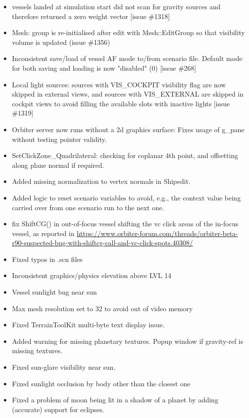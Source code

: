 \documentclass[Orbiter User Manual.tex]{subfiles}
\begin{document}
\begin{itemize}
	\item vessels landed at simulation start did not scan for gravity sources and therefore returned a zero weight vector [issue \#1318]
	\item Mesh: group is re-initialised after edit with Mesh::EditGroup so that visibility volume is updated (issue \#1356)
	\item Inconsistent save/load of vessel AF mode to/from scenario file. Default mode for both saving and loading is now "disabled" (0) [issue \#268]
	\item Local light sources: sources with VIS\_COCKPIT visibility flag are now skipped in external views, and sources with VIS\_EXTERNAL are skipped in cockpit views to avoid filling the available slots with inactive lights [issue \#1319]
	\item Orbiter server now runs without a 2d graphics surface: Fixes usage of g\_pane without testing pointer validity.
	\item SetClickZone\_Quadrilateral: checking for coplanar 4th point, and offsetting along plane normal if required.
	\item Added missing normalization to vertex normals in Shipedit.
	\item Added logic to reset scenario variables to avoid, e.g., the context value being carried over from one scenario run to the next one.
	\item fix ShiftCG() in out-of-focus vessel shifting the vc click areas of the in-focus vessel, as reported in \url{https://www.orbiter-forum.com/threads/orbiter-beta-r90-suspected-bug-with-shiftcg-call-and-vc-click-spots.40308/}
	\item Fixed typos in .scn files
	\item Inconsistent graphics/physics elevation above LVL 14
	\item Vessel sunlight bug near sun
	\item Max mesh resolution set to 32 to avoid out of video memory
	\item Fixed TerrainToolKit multi-byte text display issue.
	\item Added warning for missing planetary textures. Popup window if gravity-ref is missing textures.
	\item Fixed sun-glare visibility near sun.
	\item Fixed sunlight occlusion by body other than the closest one
	\item Fixed a problem of moon being lit in a shadow of a planet by adding (accurate) support for eclipses.

\end{itemize}
\end{document}
